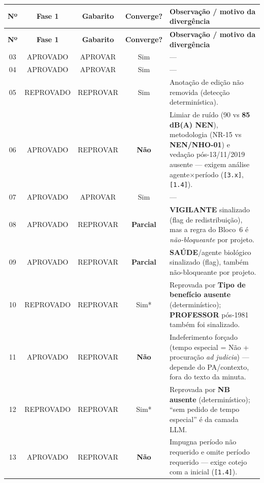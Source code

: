 \documentclass[12pt,a4paper]{article}
\begin{document}
\begin{longtable}{c c c c p{7.3cm}}
  \toprule
  \textbf{Nº} & \textbf{Fase 1} & \textbf{Gabarito} & \textbf{Converge?} & \textbf{Observação / motivo da divergência} \\
  \midrule
  \endfirsthead
  \toprule
  \textbf{Nº} & \textbf{Fase 1} & \textbf{Gabarito} & \textbf{Converge?} & \textbf{Observação / motivo da divergência} \\
  \midrule
  \endhead
  03 & \textcolor{corOK}{APROVADO}  & APROVAR  & \textcolor{corOK}{Sim} & --- \\
  04 & \textcolor{corOK}{APROVADO}  & APROVAR  & \textcolor{corOK}{Sim} & --- \\
  05 & \textcolor{corERRO}{REPROVADO} & REPROVAR & \textcolor{corOK}{Sim} & Anotação de edição não removida (detecção determinística). \\
  06 & \textcolor{corOK}{APROVADO}  & REPROVAR & \textcolor{corERRO}{\textbf{Não}} & Limiar de ruído (90 vs \textbf{85 dB(A) NEN}), metodologia (NR-15 vs \textbf{NEN/NHO-01}) e vedação pós-13/11/2019 ausente --- exigem análise agente$\times$período (\texttt{[3.x]}, \texttt{[1.4]}). \\
  07 & \textcolor{corOK}{APROVADO}  & APROVAR  & \textcolor{corOK}{Sim} & --- \\
  08 & \textcolor{corOK}{APROVADO}  & REPROVAR & \textcolor{corVERIFICAR}{\textbf{Parcial}} & \textbf{VIGILANTE} sinalizado (flag de redistribuição), mas a regra do Bloco~6 é \emph{não-bloqueante} por projeto. \\
  09 & \textcolor{corOK}{APROVADO}  & REPROVAR & \textcolor{corVERIFICAR}{\textbf{Parcial}} & \textbf{SAÚDE}/agente biológico sinalizado (flag), também não-bloqueante por projeto. \\
  10 & \textcolor{corERRO}{REPROVADO} & REPROVAR & \textcolor{corOK}{Sim*} & Reprovada por \textbf{Tipo de benefício ausente} (determinístico); \textbf{PROFESSOR} pós-1981 também foi sinalizado. \\
  11 & \textcolor{corOK}{APROVADO}  & REPROVAR & \textcolor{corERRO}{\textbf{Não}} & Indeferimento forçado (tempo especial = Não + procuração \emph{ad judicia}) --- depende do PA/contexto, fora do texto da minuta. \\
  12 & \textcolor{corERRO}{REPROVADO} & REPROVAR & \textcolor{corOK}{Sim*} & Reprovada por \textbf{NB ausente} (determinístico); ``sem pedido de tempo especial'' é da camada LLM. \\
  13 & \textcolor{corOK}{APROVADO}  & REPROVAR & \textcolor{corERRO}{\textbf{Não}} & Impugna período não requerido e omite período requerido --- exige cotejo com a inicial (\texttt{[1.4]}). \\

\end{longtable}
\end{document}
